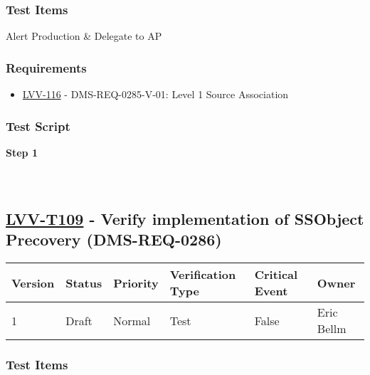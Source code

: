 \hypertarget{test-items-8}{%
\subsubsection{Test Items}\label{test-items-8}}

Alert Production \& Delegate to AP

\hypertarget{requirements-8}{%
\subsubsection{Requirements}\label{requirements-8}}

\begin{itemize}
\tightlist
\item
  \href{https://jira.lsstcorp.org/browse/LVV-116}{LVV-116} -
  DMS-REQ-0285-V-01: Level 1 Source Association
\end{itemize}

\hypertarget{test-script-8}{%
\subsubsection{Test Script}\label{test-script-8}}

\textbf{Step 1}\\
~\\
~\\

\hypertarget{lvv-t109---verify-implementation-of-ssobject-precovery-dms-req-0286}{%
\subsection{\texorpdfstring{\href{https://jira.lsstcorp.org/secure/Tests.jspa\#/testCase/LVV-T109}{LVV-T109}
- Verify implementation of SSObject Precovery
(DMS-REQ-0286)}{LVV-T109 - Verify implementation of SSObject Precovery (DMS-REQ-0286)}}\label{lvv-t109---verify-implementation-of-ssobject-precovery-dms-req-0286}}

\begin{longtable}[]{@{}llllll@{}}
\toprule
Version & Status & Priority & Verification Type & Critical Event &
Owner\tabularnewline
\midrule
\endhead
1 & Draft & Normal & Test & False & Eric Bellm\tabularnewline
\bottomrule
\end{longtable}

\hypertarget{test-items-9}{%
\subsubsection{Test Items}\label{test-items-9}}

